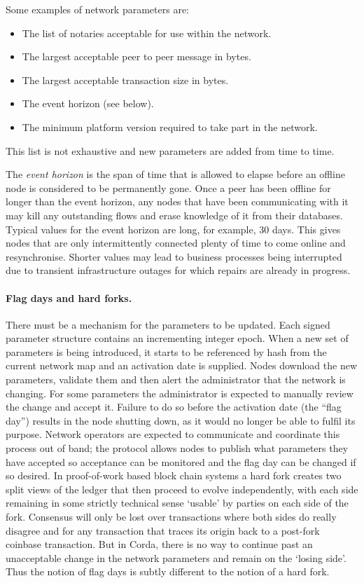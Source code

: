 \documentclass{article}
\begin{document}
Some examples of network parameters are:

\begin{itemize}
    \item The list of notaries acceptable for use within the network.
    \item The largest acceptable peer to peer message in bytes.
    \item The largest acceptable transaction size in bytes.
    \item The event horizon (see below).
    \item The minimum platform version required to take part in the network.
\end{itemize}

This list is not exhaustive and new parameters are added from time to time.

The \emph{event horizon} is the span of time that is allowed to elapse before an offline node is considered to be
permanently gone. Once a peer has been offline for longer than the event horizon, any nodes that have been
communicating with it may kill any outstanding flows and erase knowledge of it from their databases. Typical values
for the event horizon are long, for example, 30 days. This gives nodes that are only intermittently connected
plenty of time to come online and resynchronise. Shorter values may lead to business processes being interrupted
due to transient infrastructure outages for which repairs are already in progress.

\paragraph{Flag days and hard forks.}There must be a mechanism for the parameters to be updated. Each signed
parameter structure contains an incrementing integer epoch. When a new set of parameters is being introduced, it
starts to be referenced by hash from the current network map and an activation date is supplied. Nodes download the
new parameters, validate them and then alert the administrator that the network is changing. For some parameters
the administrator is expected to manually review the change and accept it. Failure to do so before the activation
date (the ``flag day'') results in the node shutting down, as it would no longer be able to fulfil its purpose.
Network operators are expected to communicate and coordinate this process out of band; the protocol allows nodes to
publish what parameters they have accepted so acceptance can be monitored and the flag day can be changed if
so desired. In proof-of-work based block chain systems a hard fork creates two split views of the ledger that
then proceed to evolve independently, with each side remaining in some strictly technical sense `usable' by parties
on each side of the fork. Consensus will only be lost over transactions where both sides do really disagree and for
any transaction that traces its origin back to a post-fork coinbase transaction. But in Corda, there is no way
to continue past an unacceptable change in the network parameters and remain on the `losing side'.
Thus the notion of flag days is subtly different to the notion of a hard fork.
\end{document}
